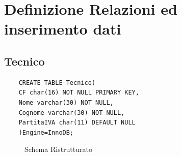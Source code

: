 \documentclass{elegantbook}
\begin{document}
\section{Definizione Relazioni ed inserimento dati}
\subsection{Tecnico}
\begin{verbatim}
	CREATE TABLE Tecnico(
	CF char(16) NOT NULL PRIMARY KEY,
	Nome varchar(30) NOT NULL,
	Cognome varchar(30) NOT NULL,
	PartitaIVA char(11) DEFAULT NULL
	)Engine=InnoDB;
\end{verbatim}
\begin{figure}[H]
	\centering
	\caption{Schema Ristrutturato}
\end{figure}
\end{document}
